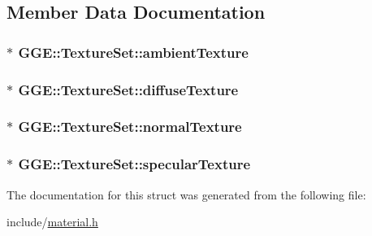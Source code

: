 \subsection{Member Data Documentation}
\hypertarget{struct_g_g_e_1_1_texture_set_a3f551a130debcd6a2339a395d8ecb955}{
\subsubsection[{ambient\+Texture}]{$\ast$ G\+G\+E\+::\+Texture\+Set\+::ambient\+Texture}}\label{struct_g_g_e_1_1_texture_set_a3f551a130debcd6a2339a395d8ecb955}
\hypertarget{struct_g_g_e_1_1_texture_set_ac67540ccfc0af2dcb42ea873e144d198}{
\subsubsection[{diffuse\+Texture}]{ $\ast$ G\+G\+E\+::\+Texture\+Set\+::diffuse\+Texture}}\label{struct_g_g_e_1_1_texture_set_ac67540ccfc0af2dcb42ea873e144d198}
\hypertarget{struct_g_g_e_1_1_texture_set_a1298833992b66a73ddaec01056f020ba}{
\subsubsection[{normal\+Texture}]{ $\ast$ G\+G\+E\+::\+Texture\+Set\+::normal\+Texture}}\label{struct_g_g_e_1_1_texture_set_a1298833992b66a73ddaec01056f020ba}
\hypertarget{struct_g_g_e_1_1_texture_set_a1e5cb782923be9a821b8515f850c5f4d}{
\subsubsection[{specular\+Texture}]{ $\ast$ G\+G\+E\+::\+Texture\+Set\+::specular\+Texture}}\label{struct_g_g_e_1_1_texture_set_a1e5cb782923be9a821b8515f850c5f4d}


The documentation for this struct was generated from the following file\+:\begin{DoxyCompactItemize}
\item 
include/\hyperlink{material_8h}{material.\+h}\end{DoxyCompactItemize}

